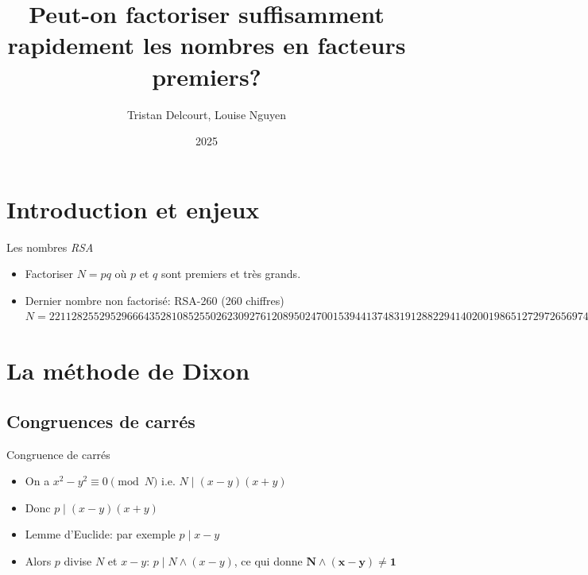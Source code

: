 \documentclass{beamer}
\title{Peut-on factoriser suffisamment rapidement les nombres en facteurs premiers?}
\author{Tristan Delcourt, Louise Nguyen}
\date{2025}
\begin{document}
\begin{frame}[plain]
    \titlepage
\end{frame}

\section{Introduction et enjeux}
\begin{frame}{Les nombres \textit{RSA}}

\begin{itemize}
    \item Factoriser $N = pq$ où $p$ et $q$ sont premiers et très grands.
    \item Dernier nombre non factorisé: RSA-260 (260 chiffres)
        \newline
        \newline
        $N=221128255295296664352810852550262309276120895\allowbreak
        0247001539441374831912882294140200198651272972656\allowbreak
        9746599085900330031400051170742204560859276357953\allowbreak
        7571859542988389587092292384910067030341246205457\allowbreak
        8456641366454068421436129301769402084639106587591\allowbreak
        4794251435144458199$
\end{itemize}

\end{frame}

\section{La méthode de Dixon}
\subsection{Congruences de carrés}
\begin{frame}{Congruence de carrés}

\begin{itemize}[<+->]
\item On a $x^2 - y^2 \equiv 0 \pmod N$ i.e. $N \mid (x-y)(x+y)$
\item Donc $p \mid (x-y)(x+y)$
\item Lemme d'Euclide: par exemple $p \mid x-y$
\item Alors $p$ divise $N$ et $x-y$: $p \mid N \land (x-y)$, ce qui donne $\mathbf{N \land(x-y)\neq1}$
\end{itemize}

    
\end{frame}
\end{document}
